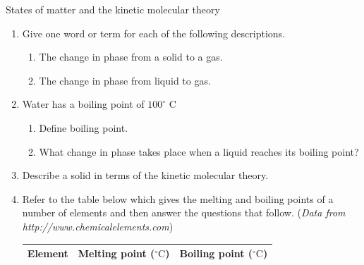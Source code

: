             \begin{eocexercises}{States of matter and the kinetic molecular theory}
            \nopagebreak \noindent \vspace{-.5cm}
\label{m38730*id311490}\begin{enumerate}[noitemsep, label=\textbf{\arabic*}. ] 
            \label{m38730*uid87}\item Give one word or term for each of the following 
descriptions.
\label{m38730*id311506}\begin{enumerate}[noitemsep, label=\textbf{\alph*}. ] 
            \label{m38730*uid88}\item The change in phase from a solid to a gas.
\label{m38730*uid89}\item The change in phase from liquid to gas.
\end{enumerate}
                \label{m38730*uid103}\item Water has a boiling point of $100 ^{\circ} \text{ C}$
\label{m38730*id311744}\begin{enumerate}[noitemsep, label=\textbf{\alph*}. ] 
            \label{m38730*uid104}\item Define boiling point.
\label{m38730*uid105}\item What change in phase takes place when a liquid reaches its boiling point?
\end{enumerate}
\label{m38730*id762}\item Describe a solid in terms of the kinetic molecular theory. \newline
            \label{m38730*uid108}\item Refer to the table below which gives the melting and 
boiling points of a number of elements and then answer the questions that follow. (\textsl{Data from http://www.chemicalelements.com})
          \begin{table}[H]
        \begin{center}
      \label{m38730*id311817}
      \begin{tabular}{|l|l|l|}\hline
\textbf{Element} & \textbf{Melting point ($^{\circ} \text{C}$)} & \textbf{Boiling point ($^{\circ} \text{C}$)} \\ \hline

\end{tabular}
\end{center}
\end{table}
\end{enumerate}
\end{eocexercises}
